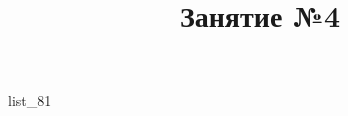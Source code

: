 \documentclass[12pt, a4paper]{article}
\begin{document}
	\title{Занятие №4}
	{list_81}
\end{document}
